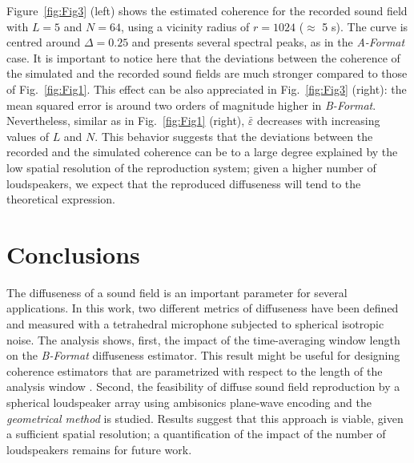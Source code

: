 Figure~\ref{fig:Fig3} (left) shows the estimated coherence for the recorded sound field with $L=5$ and $N=64$, using a vicinity radius of $r=1024$ ($\approx$ 5 s).
The curve is centred around $\Delta=0.25$ and presents several spectral peaks, as in the \textit{A-Format} case. 
It is important to notice here that the deviations between the coherence of the simulated and the recorded sound fields are much stronger compared to those of Fig.~\ref{fig:Fig1}. 
This effect can be also appreciated in Fig.~\ref{fig:Fig3} (right): the mean squared error is around two orders of magnitude higher in \textit{B-Format}.
Nevertheless, similar as in Fig.~\ref{fig:Fig1} (right), $\bar{\varepsilon}$ decreases with increasing values of $L$ and $N$.
This behavior suggests that the deviations between the recorded and the simulated coherence can be to a large degree explained by the low spatial resolution of the reproduction system; given a higher number of loudspeakers, we expect that the reproduced diffuseness will tend to the theoretical expression.




\section{Conclusions}
The diffuseness of a sound field is an important parameter for several applications. In this work, two different metrics of diffuseness have been defined and measured with a tetrahedral microphone subjected to spherical isotropic noise.
The analysis shows, first, the impact of the time-averaging window length on the \textit{B-Format} diffuseness estimator.
This result might be useful for designing coherence estimators that are parametrized with respect to the length of the analysis window \cite{thiergart_diffuseness_2011}.
Second, the feasibility of diffuse sound field reproduction by a spherical loudspeaker array using ambisonics plane-wave encoding and the \textit{geometrical method} is studied. 
Results suggest that this approach is viable, given a sufficient spatial resolution; a quantification of the impact of the number of loudspeakers remains for future work.




